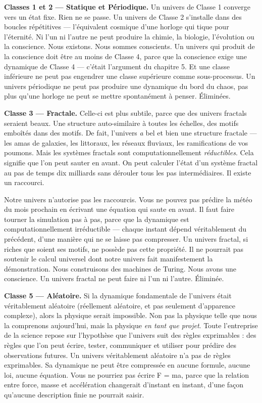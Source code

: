 \documentclass[11pt, twoside, openright]{book}
\begin{document}
\textbf{Classes 1 et 2 --- Statique et Périodique.} Un univers de Classe 1 converge vers un état fixe. Rien ne se passe. Un univers de Classe 2 s'installe dans des boucles répétitives --- l'équivalent cosmique d'une horloge qui tique pour l'éternité. Ni l'un ni l'autre ne peut produire la chimie, la biologie, l'évolution ou la conscience. Nous existons. Nous sommes conscients. Un univers qui produit de la conscience doit être au moins de Classe 4, parce que la conscience exige une dynamique de Classe 4 --- c'était l'argument du chapitre 5. Et une classe inférieure ne peut pas engendrer une classe supérieure comme sous-processus. Un univers périodique ne peut pas produire une dynamique du bord du chaos, pas plus qu'une horloge ne peut se mettre spontanément à penser. Éliminées.

\textbf{Classe 3 --- Fractale.} Celle-ci est plus subtile, parce que des univers fractals seraient beaux. Une structure auto-similaire à toutes les échelles, des motifs emboîtés dans des motifs. De fait, l'univers \textit{a} bel et bien une structure fractale --- les amas de galaxies, les littoraux, les réseaux fluviaux, les ramifications de vos poumons. Mais les systèmes fractals sont computationnellement \textit{réductibles}. Cela signifie que l'on peut sauter en avant. On peut calculer l'état d'un système fractal au pas de temps dix milliards sans dérouler tous les pas intermédiaires. Il existe un raccourci.

Notre univers n'autorise pas les raccourcis. Vous ne pouvez pas prédire la météo du mois prochain en écrivant une équation qui saute en avant. Il faut faire tourner la simulation pas à pas, parce que la dynamique est computationnellement irréductible --- chaque instant dépend véritablement du précédent, d'une manière qui ne se laisse pas compresser. Un univers fractal, si riches que soient ses motifs, ne possède pas cette propriété. Il ne pourrait pas soutenir le calcul universel dont notre univers fait manifestement la démonstration. Nous construisons des machines de Turing. Nous avons une conscience. Un univers fractal ne peut faire ni l'un ni l'autre. Éliminée.

\textbf{Classe 5 --- Aléatoire.} Si la dynamique fondamentale de l'univers était véritablement aléatoire (réellement aléatoire, et pas seulement d'apparence complexe), alors la physique serait impossible. Non pas la physique telle que nous la comprenons aujourd'hui, mais la physique \textit{en tant que projet}. Toute l'entreprise de la science repose sur l'hypothèse que l'univers suit des règles exprimables : des règles que l'on peut écrire, tester, communiquer et utiliser pour prédire des observations futures. Un univers véritablement aléatoire n'a pas de règles exprimables. Sa dynamique ne peut être compressée en aucune formule, aucune loi, aucune équation. Vous ne pourriez pas écrire F = ma, parce que la relation entre force, masse et accélération changerait d'instant en instant, d'une façon qu'aucune description finie ne pourrait saisir.
\end{document}
